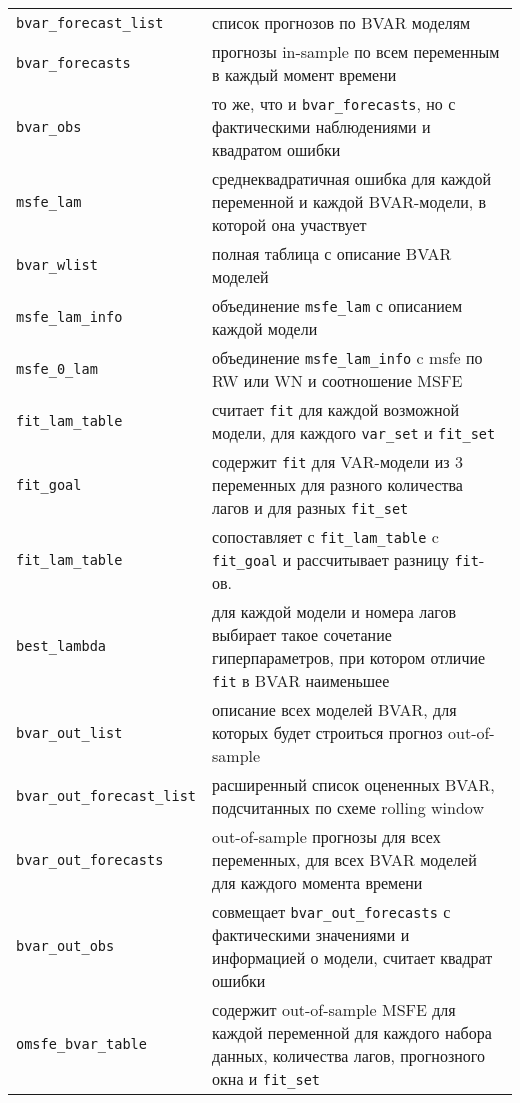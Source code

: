 \documentclass[11pt]{article} %
\begin{document}
\begin{center}
\begin{table}[h!]
\begin{tabular}{lp{10cm}}
\midrule

\verb|bvar_forecast_list|& список прогнозов по BVAR моделям\\
\verb|bvar_forecasts| &прогнозы in-sample по всем переменным в каждый момент времени\\ 
\verb|bvar_obs|& то же, что и \verb|bvar_forecasts|, но с фактическими наблюдениями и квадратом ошибки\\
\verb|msfe_lam|& среднеквадратичная ошибка для каждой переменной и каждой BVAR-модели, в которой она участвует\\
\verb|bvar_wlist|& полная таблица с описание BVAR моделей\\
\midrule
\verb|msfe_lam_info|& объединение \verb|msfe_lam| с описанием каждой модели\\
\verb|msfe_0_lam| &объединение \verb|msfe_lam_info| c msfe по RW или WN и соотношение MSFE\\
\verb|fit_lam_table|& считает \verb|fit| для каждой возможной модели, для каждого \verb|var_set| и \verb|fit_set|\\
\verb|fit_goal|& содержит \verb|fit| для VAR-модели из 3 переменных для разного количества лагов и для разных \verb|fit_set|\\
\verb|fit_lam_table|& сопоставляет с \verb|fit_lam_table| c \verb|fit_goal| и рассчитывает разницу \verb|fit|-ов.\\
\midrule
\verb|best_lambda|&для каждой модели и номера лагов выбирает такое сочетание гиперпараметров, при котором отличие \verb|fit| в BVAR наименьшее\\
\verb|bvar_out_list|& описание всех моделей BVAR, для которых будет строиться прогноз out-of-sample\\
\verb|bvar_out_forecast_list|& расширенный список оцененных BVAR, подсчитанных по схеме rolling window \\
\verb|bvar_out_forecasts|& out-of-sample прогнозы для всех переменных, для всех BVAR моделей для каждого момента времени\\
\verb|bvar_out_obs| & совмещает \verb|bvar_out_forecasts| с фактическими значениями и информацией о модели, считает квадрат ошибки\\
\midrule
\verb|omsfe_bvar_table|& содержит out-of-sample MSFE для каждой переменной для каждого набора данных, количества лагов, прогнозного окна и \verb|fit_set|\\

\end{tabular}
\end{table}
\end{center}
\end{document}
